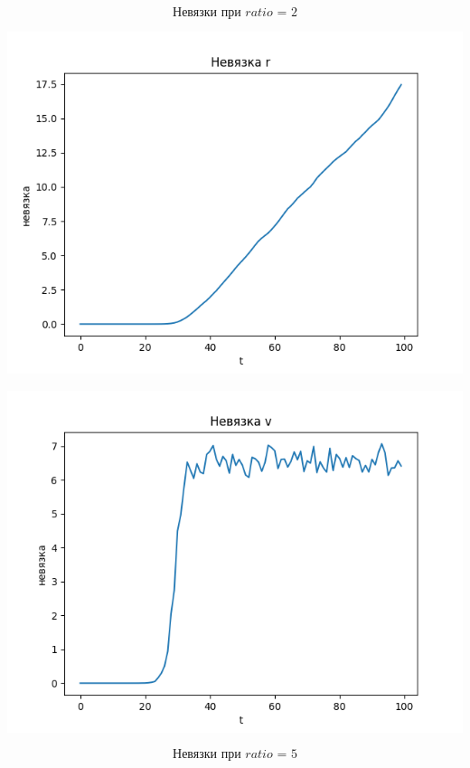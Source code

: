 \documentclass[a4paper, 12pt]{article}
\begin{document}
\[\textit{Невязки при ratio = 2}\]
\begin{minipage}{0.47\textwidth}
\begin{center}
\includegraphics[scale=0.6]{r_div5}
\end{center}
\end{minipage}
\begin{minipage}{0.47\textwidth}
\begin{center}
\includegraphics[scale=0.6]{v_div5}
\end{center}
\end{minipage}
\[\textit{Невязки при ratio = 5}\]
\end{document}
